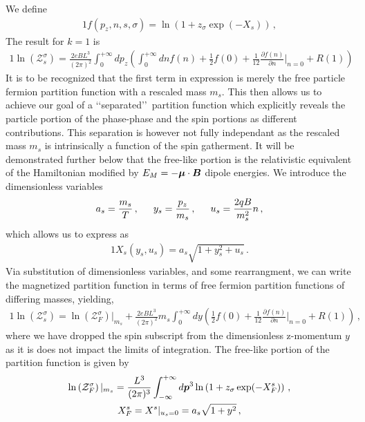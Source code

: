 We define
\begin{alignat}{1}
    \label{Func} f(p_{z},n,s,\sigma)=\ln\left(1+z_{\sigma}\exp(-X_{s})\right)\,,
\end{alignat}
The result for $k=1$ is
\begin{alignat}{1}
    \label{PartFuncTwo} \ln\left(\mathcal{Z}_{s}^{\sigma}\right)=\frac{2eBL^{3}}{(2\pi)^{2}}\int_{0}^{+\infty}dp_{z}\left(\int_{0}^{+\infty}dn f(n) + \frac{1}{2}f(0) + \frac{1}{12}\frac{\partial f(n)}{\partial n}\bigg\rvert_{n=0} + R(1)\right)
\end{alignat}
It is to be recognized that the first term in expression  is merely the free particle fermion partition function with a rescaled mass $m_{s}$. This then allows us to achieve our goal of a \lq\lq separated\rq\rq\ partition function which explicitly reveals the particle portion of the phase-phase and the spin portions as different contributions. This separation is however not fully independant as the rescaled mass $m_{s}$ is intrinsically a function of the spin gatherment. It will be demonstrated further below that the free-like portion is the relativistic equivalent of the Hamiltonian modified by $E_{M}=-\boldsymbol{\mu}\cdot\boldsymbol{B}$ dipole energies. We introduce the dimensionless variables
\begin{alignat}{1}
    \label{Unitless} a_{s}=\frac{m_{s}}{T}\,,\indent y_{s}=\frac{p_{z}}{m_{s}}\,,\indent u_{s}=\frac{2qB}{m_{s}^{2}}n\,,
\end{alignat}
which allows us to express  as
\begin{alignat}{1}
    \label{UnitlessBoltz} X_{s}(y_{s},u_{s})=a_{s}\sqrt{1+y_{s}^{2}+u_{s}}\,.
\end{alignat}
Via substitution of dimensionless variables, and some rearrangment, we can write the magnetized partition function in terms of free fermion partition functions of differing masses, yielding,
\begin{alignat}{1}
    \label{Equality} \ln\left(\mathcal{Z}^{\sigma}_{s}\right) = \ln\left(\mathcal{Z}^{\sigma}_{F}\right)|_{m_{s}} + \frac{2eBL^{3}}{(2\pi)^{2}}m_{s}\int_{0}^{+\infty}dy\left(\frac{1}{2}f(0) + \frac{1}{12}\frac{\partial f(n)}{\partial n}\bigg\rvert_{n=0} + R(1)\right)\,,
\end{alignat}
where we have dropped the spin subscript from the dimensionless z-momentum $y$ as it is does not impact the limits of integration. The free-like portion of the partition function is given by
\begin{gather}
    \label{Freelike} \ln\left(\mathcal{Z}^{\sigma}_{F}\right)|_{m_{s}}=\frac{L^{3}}{(2\pi)^{3}}\int^{+\infty}_{-\infty}d\boldsymbol{p}^{3}\ln\left(1+z_{\sigma}\exp(-X^{s}_{F})\right)\,,\\
    X^{s}_{F} = X^{s}\vert_{u_{s}=0} = a_{s}\sqrt{1+y^{2}}\,,
\end{gather}
